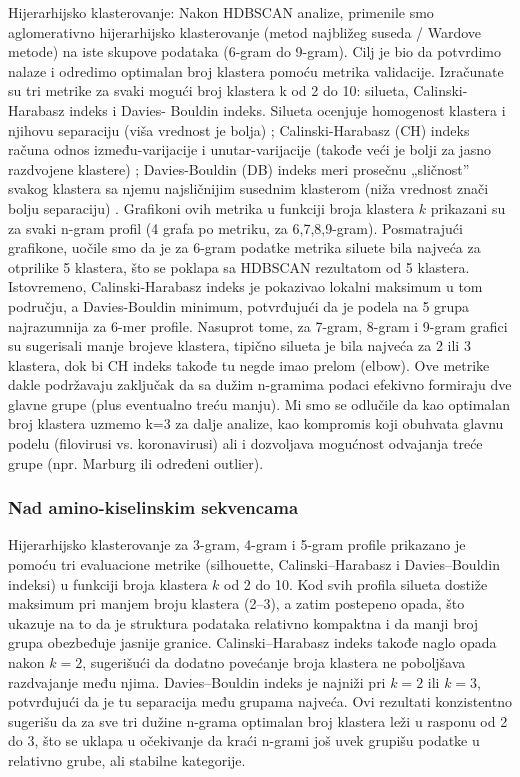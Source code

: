 \documentclass[a4paper,12pt]{article}
\begin{document}
Hijerarhijsko klasterovanje: Nakon HDBSCAN analize, primenile smo aglomerativno hijerarhijsko
klasterovanje (metod najbližeg suseda / Wardove metode) na iste skupove podataka (6-gram do 9-gram).
Cilj je bio da potvrdimo nalaze i odredimo optimalan broj klastera pomoću metrika validacije. Izračunate su
tri metrike za svaki mogući broj klastera k od 2 do 10: silueta, Calinski-Harabasz indeks i Davies-
Bouldin indeks. Silueta ocenjuje homogenost klastera i njihovu separaciju (viša vrednost je bolja) ; Calinski-Harabasz (CH) indeks računa odnos između-varijacije i unutar-varijacije (takođe veći je bolji za jasno
razdvojene klastere) ; Davies-Bouldin (DB) indeks meri prosečnu „sličnost” svakog klastera sa njemu
najsličnijim susednim klasterom (niža vrednost znači bolju separaciju) . Grafikoni ovih metrika u funkciji
broja klastera $k$ prikazani su za svaki n-gram profil (4 grafa po metriku, za 6,7,8,9-gram). Posmatrajući
grafikone, uočile smo da je za 6-gram podatke metrika siluete bila najveća za otprilike 5 klastera, što se
poklapa sa HDBSCAN rezultatom od 5 klastera. Istovremeno, Calinski-Harabasz indeks je pokazivao lokalni
maksimum u tom području, a Davies-Bouldin minimum, potvrđujući da je podela na 5 grupa najrazumnija
za 6-mer profile. Nasuprot tome, za 7-gram, 8-gram i 9-gram grafici su sugerisali manje brojeve klastera, 
tipično silueta je bila najveća za 2 ili 3 klastera, dok bi CH indeks takođe tu negde imao prelom (elbow). Ove
metrike dakle podržavaju zaključak da sa dužim n-gramima podaci efekivno formiraju dve glavne grupe
(plus eventualno treću manju). Mi smo se odlučile da kao optimalan broj klastera uzmemo k=3 za dalje
analize, kao kompromis koji obuhvata glavnu podelu (filovirusi vs. koronavirusi) ali i dozvoljava mogućnost
odvajanja treće grupe (npr. Marburg ili određeni outlier).

\subsubsection{Nad amino-kiselinskim sekvencama}

\noindent
\begin{minipage}{\textwidth}
Hijerarhijsko klasterovanje za 3-gram, 4-gram i 5-gram profile prikazano je pomoću tri evaluacione metrike 
(silhouette, Calinski–Harabasz i Davies–Bouldin indeksi) u funkciji broja klastera $k$ od 2 do 10. Kod svih profila 
silueta dostiže maksimum pri manjem broju klastera (2–3), a zatim postepeno opada, što ukazuje na to da je struktura 
podataka relativno kompaktna i da manji broj grupa obezbeđuje jasnije granice. Calinski–Harabasz indeks takođe naglo 
opada nakon $k=2$, sugerišući da dodatno povećanje broja klastera ne poboljšava razdvajanje među njima. Davies–Bouldin 
indeks je najniži pri $k=2$ ili $k=3$, potvrđujući da je tu separacija među grupama najveća. Ovi rezultati konzistentno 
sugerišu da za sve tri dužine n-grama optimalan broj klastera leži u rasponu od 2 do 3, što se uklapa u očekivanje da kraći 
n-grami još uvek grupišu podatke u relativno grube, ali stabilne kategorije.
\end{minipage}
\end{document}
